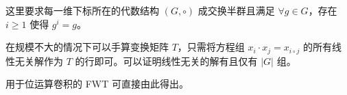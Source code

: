 这里要求每一维下标所在的代数结构 $(G, \circ)$ 成交换半群且满足 $\forall g \in G$，存在 $i \geq 1$ 使得 $g^i = g$。

在规模不大的情况下可以手算变换矩阵 $T$，只需将方程组 $x_i \cdot x_j = x_{i \circ j}$ 的所有线性无关解作为 $T$ 的行即可。可以证明线性无关的解有且仅有 $|G|$ 组。

用于位运算卷积的 FWT 可直接由此得出。